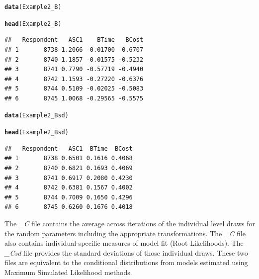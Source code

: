\documentclass{article}\usepackage{graphicx, color}
\makeatletter
\newcommand{\hlfunctioncall}[1]{\textcolor[rgb]{0.501960784313725,0,0.329411764705882}{\textbf{#1}}}%
\newenvironment{kframe}{%
 \def\at@end@of@kframe{}%
 \ifinner\ifhmode%
  \def\at@end@of@kframe{\end{minipage}}%
  \begin{minipage}{\columnwidth}%
 \fi\fi%
 \def\FrameCommand##1{\hskip\@totalleftmargin \hskip-\fboxsep
 \colorbox{shadecolor}{##1}\hskip-\fboxsep
     \hskip-\linewidth \hskip-\@totalleftmargin \hskip\columnwidth}%
 \MakeFramed {\advance\hsize-\width
   \@totalleftmargin\z@ \linewidth\hsize
   \@setminipage}}%
 {\par\unskip\endMakeFramed%
 \at@end@of@kframe}
\newenvironment{knitrout}{}{} %
\makeatother
\begin{document}
\begin{knitrout}
\color{fgcolor}\begin{kframe}
\begin{alltt}

\hlfunctioncall{data}(Example2_B)

\hlfunctioncall{head}(Example2_B)
\end{alltt}
\begin{verbatim}
##   Respondent   ASC1    BTime   BCost
## 1       8738 1.2066 -0.01700 -0.6707
## 2       8740 1.1857 -0.01575 -0.5232
## 3       8741 0.7790 -0.57719 -0.4940
## 4       8742 1.1593 -0.27220 -0.6376
## 5       8744 0.5109 -0.02025 -0.5083
## 6       8745 1.0068 -0.29565 -0.5575
\end{verbatim}
\begin{alltt}

\hlfunctioncall{data}(Example2_Bsd)

\hlfunctioncall{head}(Example2_Bsd)
\end{alltt}
\begin{verbatim}
##   Respondent   ASC1  BTime  BCost
## 1       8738 0.6501 0.1616 0.4068
## 2       8740 0.6821 0.1693 0.4069
## 3       8741 0.6917 0.2080 0.4230
## 4       8742 0.6381 0.1567 0.4002
## 5       8744 0.7009 0.1650 0.4296
## 6       8745 0.6260 0.1676 0.4018
\end{verbatim}
\end{kframe}
\end{knitrout}


The \emph{\_C} file contains the average across iterations of the individual level draws for the random parameters including the appropriate transformations. The \emph{\_C} file also contains individual-specific measures of model fit (Root Likelihoods). The \emph{\_Csd} file provides the standard deviations of those individual draws. These two files are equivalent to the conditional distributions from models estimated using Maximum Simulated Likelihood methods.
\end{document}
